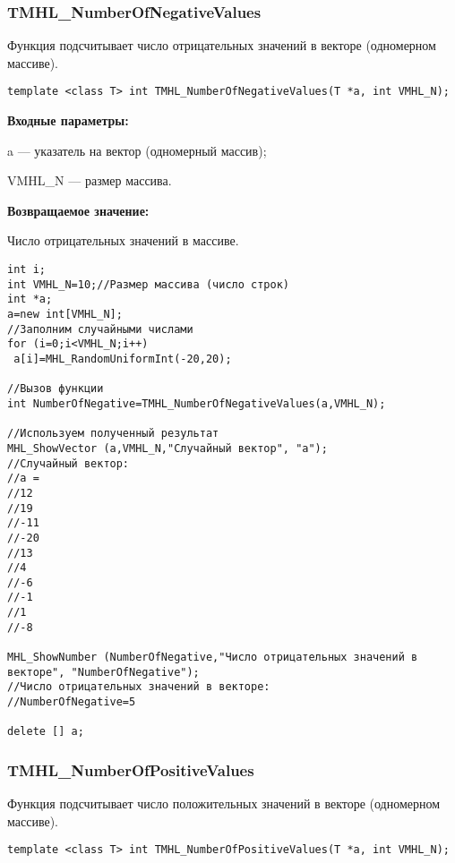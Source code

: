 \documentclass[a4paper,12pt]{article}
\begin{document}
\subsubsection{TMHL\_NumberOfNegativeValues}\label{TMHL_NumberOfNegativeValues}

Функция подсчитывает число отрицательных значений в векторе (одномерном массиве).


\begin{lstlisting}[label=code_syntax_TMHL_NumberOfNegativeValues,caption=Синтаксис]
template <class T> int TMHL_NumberOfNegativeValues(T *a, int VMHL_N);
\end{lstlisting}

\textbf{Входные параметры:}

 a --- указатель на вектор (одномерный массив);
 
 VMHL\_N --- размер массива.

\textbf{Возвращаемое значение:}

 Число отрицательных значений в массиве.


\begin{lstlisting}[label=code_use_TMHL_NumberOfNegativeValues,caption=Пример использования]
int i;
int VMHL_N=10;//Размер массива (число строк)
int *a;
a=new int[VMHL_N];
//Заполним случайными числами
for (i=0;i<VMHL_N;i++)
 a[i]=MHL_RandomUniformInt(-20,20);

//Вызов функции
int NumberOfNegative=TMHL_NumberOfNegativeValues(a,VMHL_N);

//Используем полученный результат
MHL_ShowVector (a,VMHL_N,"Случайный вектор", "a");
//Случайный вектор:
//a =
//12
//19
//-11
//-20
//13
//4
//-6
//-1
//1
//-8

MHL_ShowNumber (NumberOfNegative,"Число отрицательных значений в векторе", "NumberOfNegative");
//Число отрицательных значений в векторе:
//NumberOfNegative=5

delete [] a;
\end{lstlisting}

\subsubsection{TMHL\_NumberOfPositiveValues}\label{TMHL_NumberOfPositiveValues}

Функция подсчитывает число положительных значений в векторе (одномерном массиве).


\begin{lstlisting}[label=code_syntax_TMHL_NumberOfPositiveValues,caption=Синтаксис]
template <class T> int TMHL_NumberOfPositiveValues(T *a, int VMHL_N);
\end{lstlisting}
\end{document}
